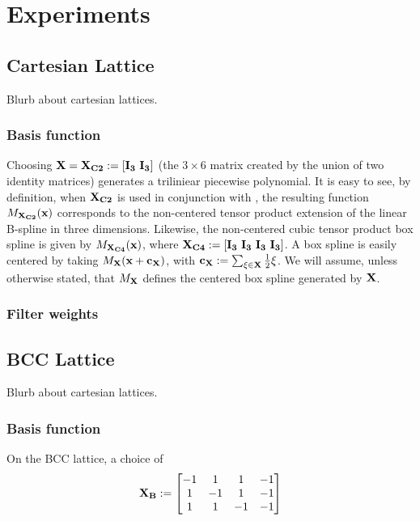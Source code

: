 \section{Experiments}

\subsection{Cartesian Lattice}
Blurb about cartesian lattices.

\subsubsection{Basis function}
Choosing $\mathbf{\mathbf{X} = \mathbf{X}_{C2} := \left[ I_3  \ I_3 \right]}$ (the $3 \times 6$ matrix created by the union of two identity matrices) generates a triliniear piecewise polynomial. It is easy to see, by definition, when $\mathbf{\mathbf{X}_{C2}}$ is used in conjunction with , the resulting function $M_\mathbf{\mathbf{X}_{C2}}(\mathbf{x})$ corresponds to the non-centered tensor product extension of the linear B-spline in three dimensions. Likewise, the non-centered cubic tensor product box spline is given by $M_\mathbf{\mathbf{X}_{C4}}(\mathbf{x})$, where $\mathbf{\mathbf{X}_{C4} := \left[ I_3  \ I_3 \ I_3  \ I_3 \right]}$. A box spline is easily centered by taking $M_\mathbf{\mathbf{X}}(\mathbf{x} + \mathbf{c_{\mathbf{X}}})$, with $\mathbf{c_{\mathbf{X}}}:=\sum_{\xi \in \mathbf{\mathbf{X}}} \frac{1}{2}\xi$. We will assume, unless otherwise stated, that $M_\mathbf{\mathbf{X}}$ defines the centered box spline generated by $\mathbf{\mathbf{X}}$.

\subsubsection{Filter weights}


\subsection{BCC Lattice}
Blurb about cartesian lattices.

\subsubsection{Basis function}
On the BCC lattice, a choice of {\footnotesize
\begin{equation*}
	\mathbf{\mathbf{X}_{B}} := 
	\begin{bmatrix} 
		-1 & 1 & 1 & -1 \\
		1 & -1 & 1 & -1 \\
		1 & 1 & -1 & -1 
	\end{bmatrix}
\end{equation*}}

